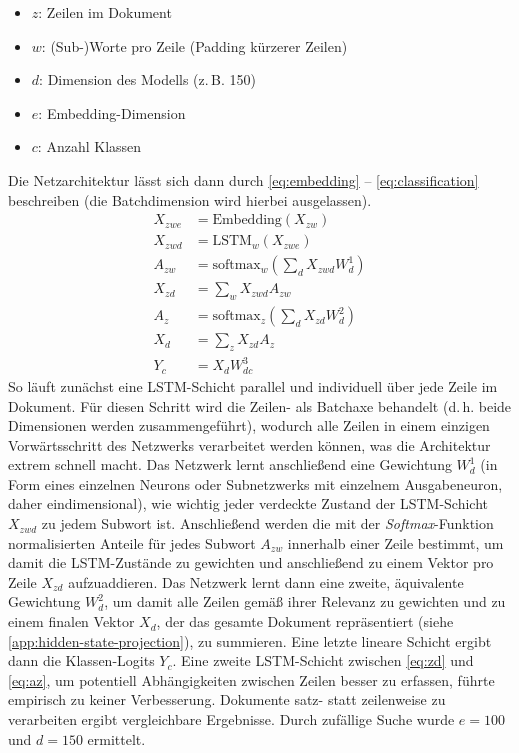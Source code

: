 \documentclass[bachelor,german]{info1thesis}
\begin{document}
%
\begin{itemize}
\itemsep-.5em
\item $z$: Zeilen im Dokument
\item $w$: (Sub-)Worte pro Zeile (Padding kürzerer Zeilen)
\item $d$: Dimension des Modells (z.\,B. 150)
\item $e$: Embedding-Dimension
\item $c$: Anzahl Klassen
\end{itemize}
%
Die Netzarchitektur lässt sich dann durch \autoref{eq:embedding} -- \ref{eq:classification} beschreiben (die Batchdimension wird hierbei ausgelassen).
%
\begin{align}
X_{zwe} &= \text{Embedding}(X_{zw}) \label{eq:embedding} \\
X_{zwd} &= \text{LSTM}_w(X_{zwe}) \label{eq:lstm} \\
A_{zw} &= \text{softmax}_w\left(\sum_d X_{zwd} W_{d}^1\right) \\
X_{zd} &= \sum_w X_{zwd} A_{zw} \label{eq:zd} \\
A_{z} &= \text{softmax}_z\left(\sum_d X_{zd} W_{d}^2\right) \label{eq:az} \\
X_{d} &= \sum_z X_{zd} A_z \label{eq:d} \\
Y_c &= X_d W_{dc}^3 \label{eq:classification}
\end{align}
%
So läuft zunächst eine LSTM-Schicht parallel und individuell über jede Zeile im Dokument. Für diesen Schritt wird die Zeilen- als Batchaxe behandelt (d.\,h. beide Dimensionen werden zusammengeführt), wodurch alle Zeilen in einem einzigen Vorwärtsschritt des Netzwerks verarbeitet werden können, was die Architektur extrem schnell macht. Das Netzwerk lernt anschließend eine Gewichtung $W_d^1$ (in Form eines einzelnen Neurons oder Subnetzwerks mit einzelnem Ausgabeneuron, daher eindimensional), wie wichtig jeder verdeckte Zustand der LSTM-Schicht $X_{zwd}$ zu jedem Subwort ist. Anschließend werden die mit der \textit{Softmax}-Funktion normalisierten Anteile für jedes Subwort $A_{zw}$ innerhalb einer Zeile bestimmt, um damit die LSTM-Zustände zu gewichten und anschließend zu einem Vektor pro Zeile $X_{zd}$ aufzuaddieren. Das Netzwerk lernt dann eine zweite, äquivalente Gewichtung $W_d^2$, um damit alle Zeilen gemäß ihrer Relevanz zu gewichten und zu einem finalen Vektor $X_d$, der das gesamte Dokument repräsentiert (siehe \autoref{app:hidden-state-projection}), zu summieren. Eine letzte lineare Schicht ergibt dann die Klassen-Logits $Y_c$.
Eine zweite LSTM-Schicht zwischen \autoref{eq:zd} und \ref{eq:az}, um potentiell Abhängigkeiten zwischen Zeilen besser zu erfassen, führte empirisch zu keiner Verbesserung. Dokumente satz- statt zeilenweise zu verarbeiten ergibt vergleichbare Ergebnisse. Durch zufällige Suche wurde $e = 100$ und $d = 150$ ermittelt. \\
\end{document}
